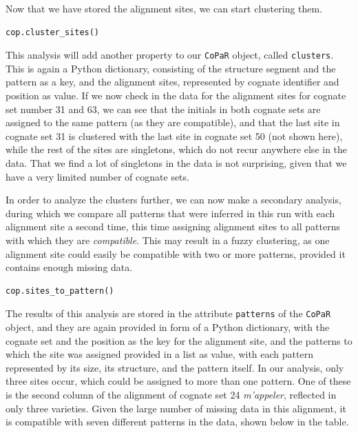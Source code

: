 \documentclass[
  a4paper,
  14pt,
  oneside,
  tablecaptionabove
]{scrbook}
\newcommand{\passthrough}[1]{#1}
\begin{document}
Now that we have stored the alignment sites, we can start clustering
them.

\begin{lstlisting}
cop.cluster_sites()
\end{lstlisting}

This analysis will add another property to our
\passthrough{\lstinline!CoPaR!} object, called
\passthrough{\lstinline!clusters!}. This is again a Python dictionary,
consisting of the structure segment and the pattern as a key, and the
alignment sites, represented by cognate identifier and position as
value. If we now check in the data for the alignment sites for cognate
set number 31 and 63, we can see that the initials in both cognate sets
are assigned to the same pattern (as they are compatible), and that the
last site in cognate set 31 is clustered with the last site in cognate
set 50 (not shown here), while the rest of the sites are singletons,
which do not recur anywhere else in the data. That we find a lot of
singletons in the data is not surprising, given that we have a very
limited number of cognate sets.

In order to analyze the clusters further, we can now make a secondary
analysis, during which we compare all patterns that were inferred in
this run with each alignment site a second time, this time assigning
alignment sites to all patterns with which they are \emph{compatible}.
This may result in a fuzzy clustering, as one alignment site could
easily be compatible with two or more patterns, provided it contains
enough missing data.

\begin{lstlisting}
cop.sites_to_pattern()
\end{lstlisting}

The results of this analysis are stored in the attribute
\passthrough{\lstinline!patterns!} of the
\passthrough{\lstinline!CoPaR!} object, and they are again provided in
form of a Python dictionary, with the cognate set and the position as
the key for the alignment site, and the patterns to which the site was
assigned provided in a list as value, with each pattern represented by
its size, its structure, and the pattern itself. In our analysis, only
three sites occur, which could be assigned to more than one pattern. One
of these is the second column of the alignment of cognate set 24
\emph{m'appeler}, reflected in only three varieties. Given the large
number of missing data in this alignment, it is compatible with seven
different patterns in the data, shown below in the table.
\end{document}
